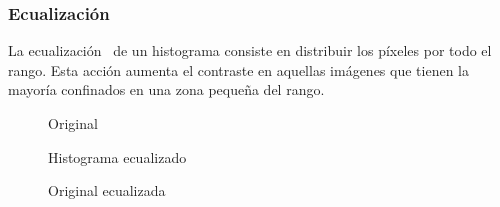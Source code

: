 \subsubsection{Ecualización}
La ecualización~\emph{\citep*[3.1.4 Histogram
  equalization]{szeliski2010computer}} de un histograma consiste en
distribuir los píxeles por todo el rango. Esta acción aumenta el
contraste en aquellas imágenes que tienen la mayoría confinados en una
zona pequeña del rango.

\begin{figure}[H]
  \caption{Original}
  \centering \setlength\fboxsep{0pt} \setlength\fboxrule{0.5pt}
\end{figure}

\begin{figure}[H]
  \caption{Histograma ecualizado}
  \centering \setlength\fboxsep{0pt} \setlength\fboxrule{0.5pt}
\end{figure}

\begin{figure}[H]
  \caption{Original ecualizada}
  \centering \setlength\fboxsep{0pt} \setlength\fboxrule{0.5pt}
\end{figure}


